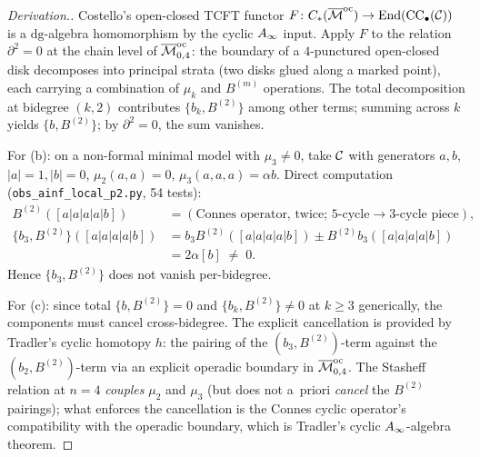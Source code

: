 \begin{proof}[Derivation.]
Costello's open-closed TCFT functor
$F \colon C_*(\overline{\mathcal{M}}^{\mathrm{oc}}) \to \mathrm{End}(\mathrm{CC}_\bullet(\mathcal{C}))$
is a $\mathrm{dg}$-algebra homomorphism by the cyclic $A_\infty$
input. Apply $F$ to the relation $\partial^2 = 0$ at the chain
level of $\overline{\mathcal{M}}^{\mathrm{oc}}_{0,4}$: the boundary of a
$4$-punctured open-closed disk decomposes into principal strata
(two disks glued along a marked point), each carrying a
combination of $\mu_k$ and $B^{(m)}$ operations. The total
decomposition at bidegree $(k, 2)$ contributes
$\{b_k, B^{(2)}\}$ among other terms; summing across $k$
yields $\{b, B^{(2)}\}$; by $\partial^2 = 0$, the sum vanishes.

For (b): on a non-formal minimal model with $\mu_3 \neq 0$,
take $\mathcal{C}$ with generators $a, b$, $|a| = 1, |b| = 0$,
$\mu_2(a, a) = 0$, $\mu_3(a, a, a) = \alpha b$. Direct
computation (\texttt{obs\_ainf\_local\_p2.py}, 54 tests):
\begin{align*}
  B^{(2)}([a | a | a | a | b])
  & = (\text{Connes operator, twice; } 5 \text{-cycle} \to 3\text{-cycle piece}),
  \\
  \{b_3, B^{(2)}\}([a|a|a|a|b])
  & = b_3 B^{(2)}([a|a|a|a|b]) \pm B^{(2)} b_3([a|a|a|a|b])
  \\
  & = 2\alpha [b] \;\neq\; 0.
\end{align*}
Hence $\{b_3, B^{(2)}\}$ does not vanish per-bidegree.

For (c): since total $\{b, B^{(2)}\} = 0$ and $\{b_k, B^{(2)}\} \neq 0$
at $k \geq 3$ generically, the components must cancel
cross-bidegree. The explicit cancellation is provided by
Tradler's cyclic homotopy $h$: the pairing of the
$(b_3, B^{(2)})$-term against the
$(b_2, B^{(2)})$-term via an explicit operadic boundary in
$\overline{\mathcal{M}}^{\mathrm{oc}}_{0, 4}$. The Stasheff relation at
$n = 4$ \emph{couples} $\mu_2$ and $\mu_3$ (but does not
a~priori \emph{cancel} the $B^{(2)}$ pairings); what enforces
the cancellation is the Connes cyclic operator's compatibility
with the operadic boundary, which is Tradler's cyclic
$A_\infty$-algebra theorem.
\end{proof}

